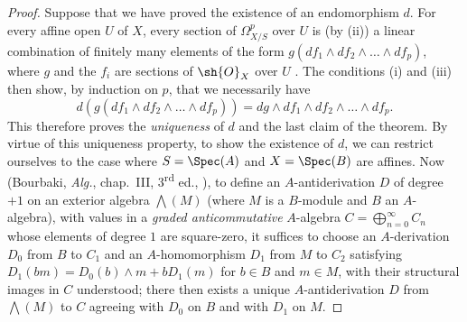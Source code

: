 \begin{proof}
Suppose that we have proved the existence of an endomorphism $d$.
For every affine open $U$ of $X$, every section of $\Omega_{X/S}^p$ over $U$ is (by \rm{(ii)}) a linear combination of finitely many elements of the form $g(df_1 \wedge df_2 \wedge \dots \wedge df_p)$, where $g$ and the $f_i$ are sections of $\sh{O}_X$ over $U$ .
The conditions \rm{(i)} and \rm{(iii)} then show, by induction on $p$, that we necessarily have
\[
  \label{IV.16.6.2.2}
  d(g(df_1 \wedge df_2 \wedge \dots \wedge df_p)) = dg \wedge df_1 \wedge df_2 \wedge \dots \wedge df_p.
  \tag{16.6.2.2}
\]
This therefore proves the \emph{uniqueness} of $d$ and the last claim of the theorem.
By virtue of this uniqueness property, to show the existence of $d$, we can restrict ourselves to the case where $S = \Spec(A)$ and $X = \Spec(B)$ are affines.
Now (Bourbaki, \emph{Alg.}, chap.~III, 3\textsuperscript{rd} ed., ), to define an $A$-antiderivation $D$ of degree $+1$ on an exterior algebra $\bigwedge(M)$ (where $M$ is a $B$-module and $B$ an $A$-algebra), with values in a \emph{graded anticommutative} $A$-algebra $C = \bigoplus_{n=0}^\infty C_n$ whose elements of degree $1$ are square-zero, it suffices to choose an $A$-derivation $D_0$ from $B$ to $C_1$ and an $A$-homomorphism $D_1$ from $M$ to $C_2$ satisfying $D_1(bm)=D_0(b)\wedge m+bD_1(m)$ for $b\in B$ and $m\in M$, with their structural images in $C$ understood;
there then exists a unique $A$-antiderivation $D$ from $\bigwedge(M)$ to $C$ agreeing with $D_0$ on $B$ and with $D_1$ on $M$. 


\end{proof}
